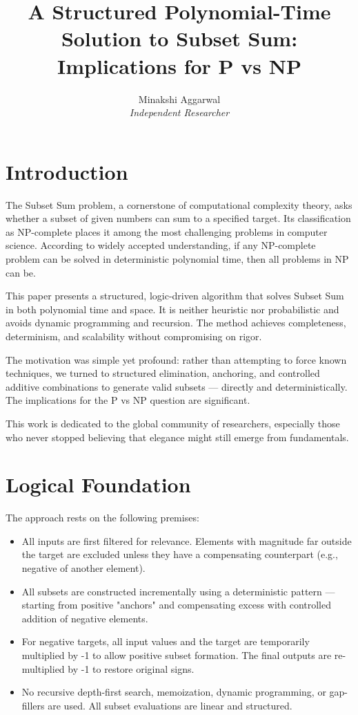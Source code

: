 \documentclass[11pt]{article}
\title{A Structured Polynomial-Time Solution to Subset Sum: Implications for P vs NP}
\author{Minakshi Aggarwal \\
\textit{Independent Researcher}}
\date{}
\begin{document}
\maketitle
\section{Introduction}

The Subset Sum problem, a cornerstone of computational complexity theory, asks whether a subset of given numbers can sum to a specified target. Its classification as NP-complete places it among the most challenging problems in computer science. According to widely accepted understanding, if any NP-complete problem can be solved in deterministic polynomial time, then all problems in NP can be.

This paper presents a structured, logic-driven algorithm that solves Subset Sum in both polynomial time and space. It is neither heuristic nor probabilistic and avoids dynamic programming and recursion. The method achieves completeness, determinism, and scalability without compromising on rigor.

The motivation was simple yet profound: rather than attempting to force known techniques, we turned to structured elimination, anchoring, and controlled additive combinations to generate valid subsets — directly and deterministically. The implications for the P vs NP question are significant.

This work is dedicated to the global community of researchers, especially those who never stopped believing that elegance might still emerge from fundamentals.
\section{Logical Foundation}

The approach rests on the following premises:

\begin{itemize}
  \item All inputs are first filtered for relevance. Elements with magnitude far outside the target are excluded unless they have a compensating counterpart (e.g., negative of another element).
  \item All subsets are constructed incrementally using a deterministic pattern — starting from positive "anchors" and compensating excess with controlled addition of negative elements.
  \item For negative targets, all input values and the target are temporarily multiplied by -1 to allow positive subset formation. The final outputs are re-multiplied by -1 to restore original signs.
  \item No recursive depth-first search, memoization, dynamic programming, or gap-fillers are used. All subset evaluations are linear and structured.
\end{itemize}
\end{document}
